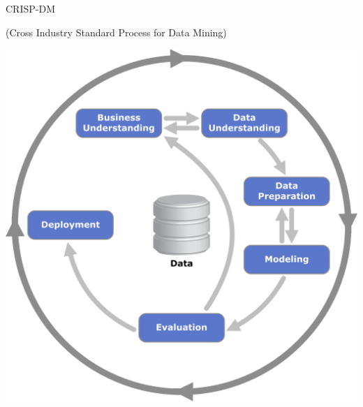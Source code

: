 \documentclass[aspectratio=169]{beamer}
\begin{document}
\begin{frame}{CRISP-DM}

(Cross Industry Standard Process for Data Mining)

\begin{center}
\includegraphics[height=0.7\textheight]{images/crisp.png}
\end{center}

\end{frame}
\end{document}
